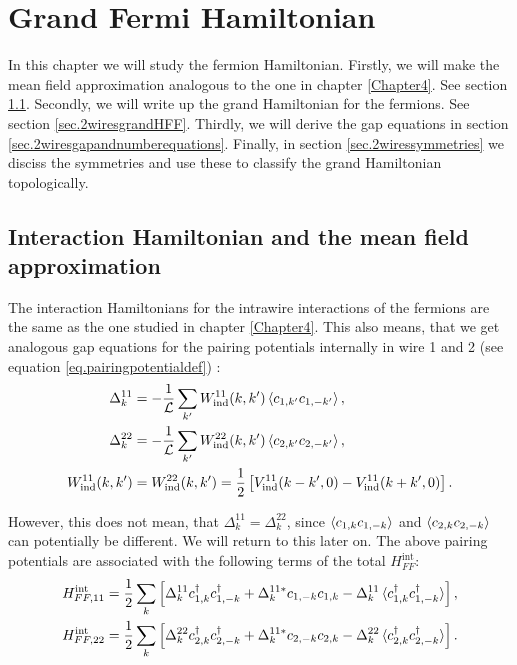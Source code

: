 
\chapter{Grand Fermi Hamiltonian} %

\label{Chapter9} %


In this chapter we will study the fermion Hamiltonian. Firstly, we will make the mean field approximation analogous to the one in chapter \ref{Chapter4}. See section \ref{sec.2wiresmeanfieldapproximation}. Secondly, we will write up the grand Hamiltonian for the fermions. See section \ref{sec.2wiresgrandHFF}. Thirdly, we will derive the gap equations in section \ref{sec.2wiresgapandnumberequations}. Finally, in section \ref{sec.2wiressymmetries} we disciss the symmetries and use these to classify the grand Hamiltonian topologically. 

\section{Interaction Hamiltonian and the mean field approximation}
\label{sec.2wiresmeanfieldapproximation}
The interaction Hamiltonians for the intrawire interactions of the fermions are the same as the one studied in chapter \ref{Chapter4}. This also means, that we get analogous gap equations for the pairing potentials internally in wire 1 and 2 (see equation \ref{eq.pairingpotentialdef}) :
\begin{align}
\Delta^{11}_k &= -\frac{1}{\mathcal{L}} \sum_{k'} W_{\text{ind}}^{11}(k,k')\braket{c_{1,k'}c_{1,-k'}}, \nonumber \\
\Delta^{22}_k &= -\frac{1}{\mathcal{L}} \sum_{k'} W_{\text{ind}}^{22}(k,k')\braket{c_{2,k'}c_{2,-k'}}, \nonumber \\
W_{\text{ind}}^{11}(k,k') &= W_{\text{ind}}^{22}(k,k') = \frac{1}{2}\left[V_{\text{ind}}^{11}(k-k',0) - V_{\text{ind}}^{11}(k+k',0) \right].
\label{eq.pairingpotentialsintrawire}
\end{align}

However, this does not mean, that $\Delta^{11}_k = \Delta^{22}_k$, since $\braket{c_{1,k}c_{1,-k}}$ and $\braket{c_{2,k}c_{2,-k}}$ can potentially be different. We will return to this later on. The above pairing potentials are associated with the following terms of the total $H^\text{int}_{FF}$:
\begin{align}
H^\text{int}_{FF,11} &= \frac{1}{2}\sum_k \left[\Delta^{11}_k c^\dagger_{1,k}c^\dagger_{1,-k} + \Delta^{11 *}_k c_{1,-k}c_{1,k} - \Delta^{11}_k\braket{c^\dagger_{1,k}c^\dagger_{1,-k}} \right], \nonumber \\
H^\text{int}_{FF,22} &= \frac{1}{2}\sum_k \left[\Delta^{22}_k c^\dagger_{2,k}c^\dagger_{2,-k} + \Delta^{11 *}_k c_{2,-k}c_{2,k} - \Delta^{22}_k\braket{c^\dagger_{2,k}c^\dagger_{2,-k}} \right].
\label{eq.Hintintrawire}
\end{align}

